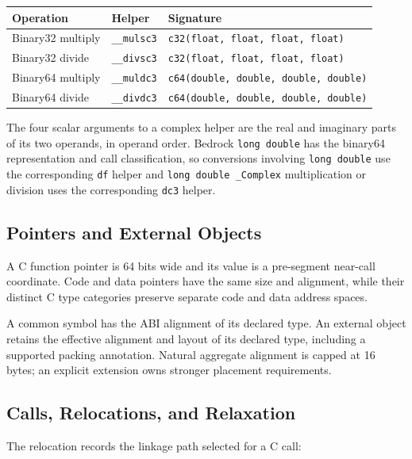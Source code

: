 \documentclass[10pt,twoside]{article}
\begin{document}
\begingroup\footnotesize
\setlength{\tabcolsep}{2pt}
\begin{longtable}{@{}p{1.55in}p{1.55in}p{2.45in}@{}}
\toprule
\textbf{Operation} & \textbf{Helper} & \textbf{Signature}\\
\midrule
\endhead
Binary32 multiply & \texttt{\_\allowbreak{}\_\allowbreak{}mulsc3} & \texttt{c32(float, float, float, float)}\\
Binary32 divide & \texttt{\_\allowbreak{}\_\allowbreak{}divsc3} & \texttt{c32(float, float, float, float)}\\
Binary64 multiply & \texttt{\_\allowbreak{}\_\allowbreak{}muldc3} & \texttt{c64(double, double, double, double)}\\
Binary64 divide & \texttt{\_\allowbreak{}\_\allowbreak{}divdc3} & \texttt{c64(double, double, double, double)}\\
\bottomrule
\end{longtable}
\endgroup

The four scalar arguments to a complex helper are the real and imaginary parts
of its two operands, in operand order. Bedrock \texttt{long double} has the
binary64 representation and call classification, so conversions involving
\texttt{long double} use the corresponding \texttt{df} helper and
\texttt{long double \_Complex} multiplication or division uses the
corresponding \texttt{dc3} helper.

\subsection{Pointers and External Objects}
A C function pointer is 64 bits wide and its value is a pre-segment near-call
coordinate. Code and data pointers have the
same size and alignment, while their distinct C type categories preserve
separate code and data address spaces.

A common symbol has the ABI alignment of its declared type. An external object
retains the effective alignment and layout of its declared type, including a
supported packing annotation. Natural aggregate alignment is capped at 16
bytes; an explicit extension owns stronger placement requirements.

\subsection{Calls, Relocations, and Relaxation}
The relocation records the linkage path selected for a C call:
\end{document}
